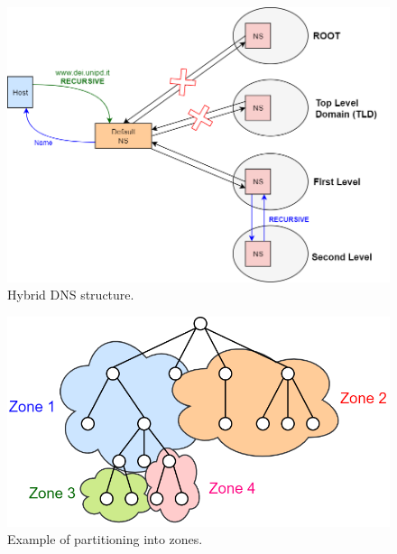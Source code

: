 \begin{figure}[h]
\centering
\includegraphics[scale=0.4]{Images/Resolution/hybrid_DNS}
\caption{\footnotesize{Hybrid DNS structure.}}\label{hybrid_DNS}
\end{figure}
\begin{figure}[h]
\centering
\includegraphics[scale=0.4]{Images/Resolution/DNS_zone}
\caption{\footnotesize{Example of partitioning into zones.}}\label{DNS_zone}
\end{figure}
